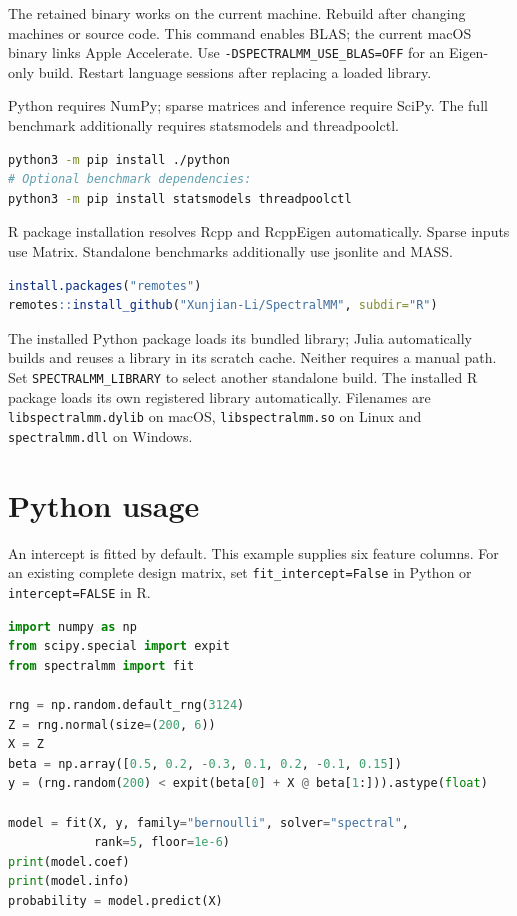 \documentclass[10pt,a4paper]{article}
\begin{document}
The retained binary works on the current machine. Rebuild after changing machines
or source code. This command enables BLAS; the current macOS binary links Apple Accelerate.
Use \texttt{-DSPECTRALMM\_USE\_BLAS=OFF} for an Eigen-only build.
Restart language sessions after replacing a loaded library.

Python requires NumPy; sparse matrices and inference require SciPy. The full
benchmark additionally requires statsmodels and threadpoolctl.

\begin{lstlisting}[language=bash]
python3 -m pip install ./python
# Optional benchmark dependencies:
python3 -m pip install statsmodels threadpoolctl
\end{lstlisting}

R package installation resolves Rcpp and RcppEigen automatically. Sparse inputs
use Matrix. Standalone benchmarks additionally use jsonlite and MASS.
\begin{lstlisting}[language=R]
install.packages("remotes")
remotes::install_github("Xunjian-Li/SpectralMM", subdir="R")
\end{lstlisting}

The installed Python package loads its bundled library; Julia automatically
builds and reuses a library in its scratch cache. Neither requires a manual path.
Set \texttt{SPECTRALMM\_LIBRARY} to select another standalone build.
The installed R package loads its own registered library automatically.
Filenames are \texttt{libspectralmm.dylib} on macOS, \texttt{libspectralmm.so}
on Linux and \texttt{spectralmm.dll} on Windows.

\section{Python usage}
An intercept is fitted by default. This example supplies six feature columns.
For an existing complete design matrix, set \texttt{fit\_intercept=False} in
Python or \texttt{intercept=FALSE} in R.

\begin{lstlisting}[language=Python]
import numpy as np
from scipy.special import expit
from spectralmm import fit

rng = np.random.default_rng(3124)
Z = rng.normal(size=(200, 6))
X = Z
beta = np.array([0.5, 0.2, -0.3, 0.1, 0.2, -0.1, 0.15])
y = (rng.random(200) < expit(beta[0] + X @ beta[1:])).astype(float)

model = fit(X, y, family="bernoulli", solver="spectral",
            rank=5, floor=1e-6)
print(model.coef)
print(model.info)
probability = model.predict(X)
\end{lstlisting}
\end{document}
